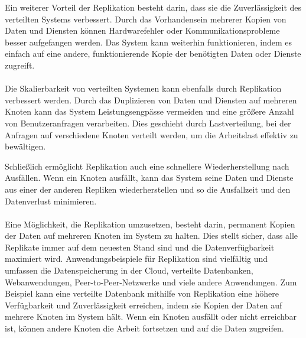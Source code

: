 \documentclass[../vs-script-first-v01.tex]{subfiles}
\begin{document}
Ein weiterer Vorteil der Replikation besteht darin, dass sie die Zuverlässigkeit des verteilten Systems verbessert. Durch das Vorhandensein mehrerer Kopien von Daten und Diensten können Hardwarefehler oder Kommunikationsprobleme besser aufgefangen werden. Das System kann weiterhin funktionieren, indem es einfach auf eine andere, funktionierende Kopie der benötigten Daten oder Dienste zugreift.
\\\\
Die Skalierbarkeit von verteilten Systemen kann ebenfalls durch Replikation verbessert werden. Durch das Duplizieren von Daten und Diensten auf mehreren Knoten kann das System Leistungsengpässe vermeiden und eine größere Anzahl von Benutzeranfragen verarbeiten. Dies geschieht durch Lastverteilung, bei der Anfragen auf verschiedene Knoten verteilt werden, um die Arbeitslast effektiv zu bewältigen.

Schließlich ermöglicht Replikation auch eine schnellere Wiederherstellung nach Ausfällen. Wenn ein Knoten ausfällt, kann das System seine Daten und Dienste aus einer der anderen Repliken wiederherstellen und so die Ausfallzeit und den Datenverlust minimieren.
\\\\
Eine Möglichkeit, die Replikation umzusetzen, besteht darin, permanent Kopien der Daten auf mehreren Knoten im System zu halten. Dies stellt sicher, dass alle Replikate immer auf dem neuesten Stand sind und die Datenverfügbarkeit maximiert wird.
Anwendungsbeispiele für Replikation sind vielfältig und umfassen die Datenspeicherung in der Cloud, verteilte Datenbanken, Webanwendungen, Peer-to-Peer-Netzwerke und viele andere Anwendungen. Zum Beispiel kann eine verteilte Datenbank mithilfe von Replikation eine höhere Verfügbarkeit und Zuverlässigkeit erreichen, indem sie Kopien der Daten auf mehrere Knoten im System hält. Wenn ein Knoten ausfällt oder nicht erreichbar ist, können andere Knoten die Arbeit fortsetzen und auf die Daten zugreifen.
\end{document}
